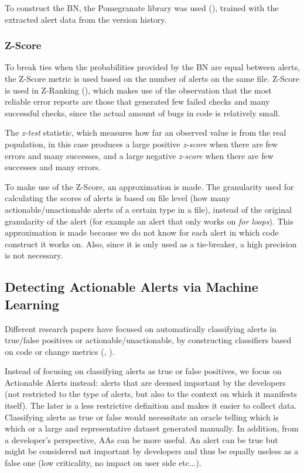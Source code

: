 \documentclass{article}
\begin{document}
To construct the BN, the Pomegranate library was used (\cite{pomegranate}), trained with the extracted alert data from the version history.

\subsubsection{Z-Score}
To break ties when the probabilities provided by the BN are equal between alerts, the Z-Score metric is used based on the number of alerts on the same file. Z-Score is used in Z-Ranking (\cite{z-ranking}), which makes use of the observation that the most reliable error reports are those that generated few failed checks and many successful checks, since the actual amount of bugs in code is relatively small. 

The \textit{z-test} statistic, which measures how far an observed value is from the real population, in this case produces a large positive \textit{z-score} when there are few errors and many successes, and a large negative \textit{z-score} when there are few successes and many errors.

To make use of the Z-Score, an approximation is made. The granularity used for calculating the scores of alerts is based on file level (how many actionable/unactionable alerts of a certain type in a file), instead of the original granularity of the alert (for example an alert that only works on \textit{for loops}). This approximation is made because we do not know for each alert in which code construct it works on. Also, since it is only used as a tie-breaker, a high precision is not necessary.

\subsection{Detecting Actionable Alerts via Machine Learning}

Different research papers have focused on automatically classifying alerts in true/false positives or actionable/unactionable, by constructing classifiers based on code or change metrics (\cite{actionable_sa}, \cite{model_building_actionable}).

Instead of focusing on classifying alerts as true or false positives, we focus on Actionable Alerts instead: alerts that are deemed important by the developers (not restricted to the type of alerts, but also to the context on which it manifests itself). The later is a less restrictive definition and makes it easier to collect data. Classifying alerts as true or false would necessitate an oracle telling which is which or a large and representative dataset generated manually. In addition, from a developer's perspective, AAs can be more useful. An alert can be true but might be considered not important by developers and thus be equally useless as a false one (low criticality, no impact on user side etc...).
\end{document}
